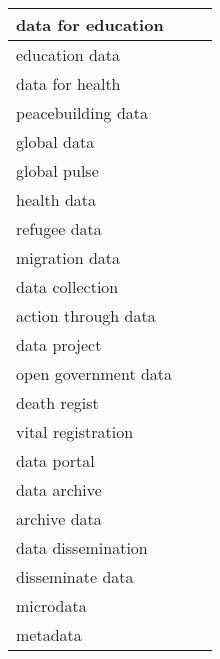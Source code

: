 \documentclass[
]{article}
\begin{document}
\begin{table}[H]
\begin{tabular}{l|l|l}
\hline
data for education &  & \\
\hline
education data &  & \\
\hline
data for health &  & \\
\hline
peacebuilding data &  & \\
\hline
global data &  & \\
\hline
global pulse &  & \\
\hline
health data &  & \\
\hline
refugee data &  & \\
\hline
migration data &  & \\
\hline
data collection &  & \\
\hline
action through data &  & \\
\hline
data project &  & \\
\hline
open government data &  & \\
\hline
death regist &  & \\
\hline
vital registration &  & \\
\hline
data portal &  & \\
\hline
data archive &  & \\
\hline
archive data &  & \\
\hline
data dissemination &  & \\
\hline
disseminate data &  & \\
\hline
microdata &  & \\
\hline
metadata &  & \\
\hline
\end{tabular}
\endgroup{}
\end{table}
\end{document}
